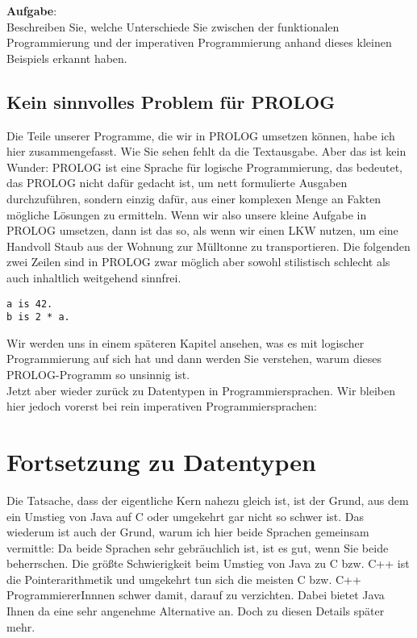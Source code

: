 \textbf{Aufgabe}:\\

Beschreiben Sie, welche Unterschiede Sie zwischen der funktionalen Programmierung und der imperativen Programmierung anhand dieses kleinen Beispiels erkannt haben.

\subsection{Kein sinnvolles Problem für PROLOG}

Die Teile unserer Programme, die wir in PROLOG umsetzen können, habe ich hier zusammengefasst. Wie Sie sehen fehlt da die Textausgabe. Aber das ist kein Wunder: PROLOG ist eine Sprache für logische Programmierung, das bedeutet, das PROLOG nicht dafür gedacht ist, um nett formulierte Ausgaben durchzuführen, sondern einzig dafür, aus einer komplexen Menge an Fakten mögliche Lösungen zu ermitteln. Wenn wir also unsere kleine Aufgabe in PROLOG umsetzen, dann ist das so, als wenn wir einen LKW nutzen, um eine Handvoll Staub aus der Wohnung zur Mülltonne zu transportieren. Die folgenden zwei Zeilen sind in PROLOG zwar möglich aber sowohl stilistisch schlecht als auch inhaltlich weitgehend sinnfrei.

\begin{verbatim}
a is 42.
b is 2 * a.
\end{verbatim}

Wir werden uns in einem späteren Kapitel ansehen, was es mit logischer Programmierung auf sich hat und dann werden Sie verstehen, warum dieses PROLOG-Programm so unsinnig ist.\\

Jetzt aber wieder zurück zu Datentypen in Programmiersprachen. Wir bleiben hier jedoch vorerst bei rein imperativen Programmiersprachen:

\section{Fortsetzung zu Datentypen}

Die Tatsache, dass der eigentliche Kern nahezu gleich ist, ist der Grund, aus dem ein Umstieg von Java auf C oder umgekehrt gar nicht so schwer ist. Das wiederum ist auch der Grund, warum ich hier beide Sprachen gemeinsam vermittle: Da beide Sprachen sehr gebräuchlich ist, ist es gut, wenn Sie beide beherrschen. Die größte Schwierigkeit beim Umstieg von Java zu C bzw. C++ ist die Pointerarithmetik und umgekehrt tun sich die meisten C bzw. C++ ProgrammiererInnnen schwer damit, darauf zu verzichten. Dabei bietet Java Ihnen da eine sehr angenehme Alternative an. Doch zu diesen Details später mehr.\\

